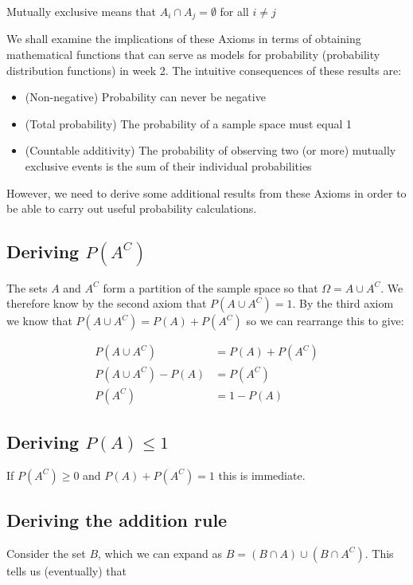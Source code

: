 \documentclass{book}
\begin{document}
Mutually exclusive means that $A_i \cap A_j = \emptyset$ for all $i \neq j$


We shall examine the implications of these Axioms in terms of obtaining mathematical functions that can serve as models for probability (probability distribution functions) in week 2.   The intuitive consequences of these results are:

\begin{itemize}
\item (Non-negative) Probability can never be negative
\item (Total probability) The probability of a sample space must equal 1 
\item (Countable additivity) The probability of observing two (or more) mutually exclusive events is the sum of their individual probabilities
\end{itemize}

However, we need to derive some additional results from these Axioms in order to be able to carry out useful probability calculations.



\subsection{Deriving $P(A^C)$}

The sets $A$ and $A^C$ form a partition of the sample space so that $\Omega = A \cup A^C$.   We therefore know by the second axiom that $P(A \cup A^C) = 1$.   By the third axiom we know that $P(A \cup A^C) = P(A) + P(A^C)$ so we can rearrange this to give:

\begin{align*}
P(A \cup A^C) &= P(A) + P(A^C) \\
P(A \cup A^C) - P(A) &= P(A^C) \\
P(A^C) &= 1 - P(A)
\end{align*}

\subsection{Deriving $P(A) \leq 1$}

If $P(A^C) \geq 0$ and $P(A) + P(A^C) = 1$ this is immediate.

\subsection{Deriving the addition rule}

Consider the set $B$, which we can expand as $B=(B \cap A) \cup (B \cap A^C)$.   This tells us (eventually) that
\end{document}

